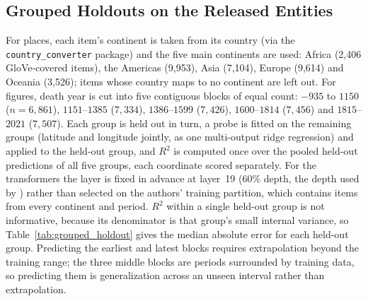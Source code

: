 \documentclass[11pt]{article}
\begin{document}
\subsection{Grouped Holdouts on the Released Entities}
\label{sec:grouped_holdout}

For places, each item's continent is taken from its country (via the
\texttt{country\_converter} package) and the five main continents are used: Africa (2{,}406
GloVe-covered items), the Americas (9{,}953), Asia (7{,}104), Europe (9{,}614) and Oceania
(3{,}526); items whose country maps to no continent are left out. For figures, death year is
cut into five contiguous blocks of equal count: $-935$ to $1150$ ($n = 6{,}861$), $1151$--$1385$
($7{,}334$), $1386$--$1599$ ($7{,}426$), $1600$--$1814$ ($7{,}456$) and $1815$--$2021$
($7{,}507$). Each group is held out in turn, a probe is fitted on the remaining groups
(latitude and longitude jointly, as one multi-output ridge regression) and applied to the
held-out group, and $R^2$ is computed once over the pooled held-out predictions of all five
groups, each coordinate scored separately. For the transformers the layer is fixed in
advance at layer~19 (60\% depth, the depth used by \citet{gurnee2024language}) rather than
selected on the authors' training partition, which contains items from every continent and
period. $R^2$ within a single held-out group is not informative, because its denominator is
that group's small internal variance, so Table~\ref{tab:grouped_holdout} gives the median
absolute error for each held-out group. Predicting the earliest and latest blocks requires
extrapolation beyond the training range; the three middle blocks are periods surrounded by
training data, so predicting them is generalization across an unseen interval rather than
extrapolation.
\end{document}
